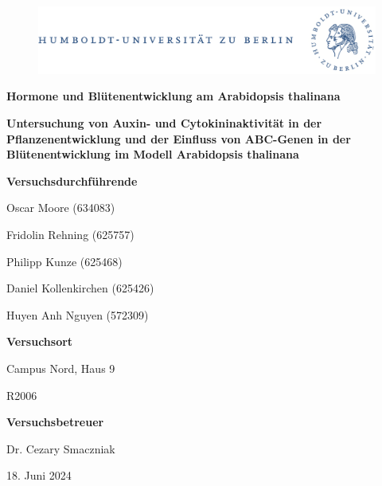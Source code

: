 \documentclass[10pt,a4paper]{article}
\begin{document}
	
	\begin{titlepage}
		\begin{center}
			\begin{figure}[h!tbp]
				\includegraphics[width=\linewidth]{HUlogo.PNG}
			\end{figure}
			\vspace*{2 cm}
			
			\textcolor{Bluetitle}{\textbf{\huge Hormone und Blütenentwicklung am Arabidopsis thalinana}}\par
			\vspace*{0.5cm}
			\textcolor{softbluetitle}{\textbf{\Large Untersuchung von Auxin- und Cytokininaktivität in der Pflanzenentwicklung und der Einfluss von ABC-Genen in der Blütenentwicklung im Modell Arabidopsis thalinana}}\par
			
			\vspace*{2cm}
			
			\textcolor{Greyish}{\textbf{Versuchsdurchführende}}\par
			\textcolor{Greyish}{Oscar Moore (634083)}\par
			\textcolor{Greyish}{Fridolin Rehning (625757)}\par
			\textcolor{Greyish}{Philipp Kunze (625468)}\par
			\textcolor{Greyish}{Daniel Kollenkirchen (625426)}\par
			\textcolor{Greyish}{Huyen Anh Nguyen (572309)}\par
			
			\vspace*{0.5cm}
			\textcolor{Greyish}{\textbf{Versuchsort}}\par
			\textcolor{Greyish}{Campus Nord, Haus 9}\par
			\textcolor{Greyish}{R2006}\par
			\vspace*{0.5cm}
			\textcolor{Greyish}{\textbf{Versuchsbetreuer}}\par
			\textcolor{Greyish}{Dr. Cezary Smaczniak}\par
			
			\vspace*{2 cm}
			
			\textcolor{Greyish}{18. Juni 2024}\par
			
			
			
			
		\end{center}
	\end{titlepage}
	
\end{document}
